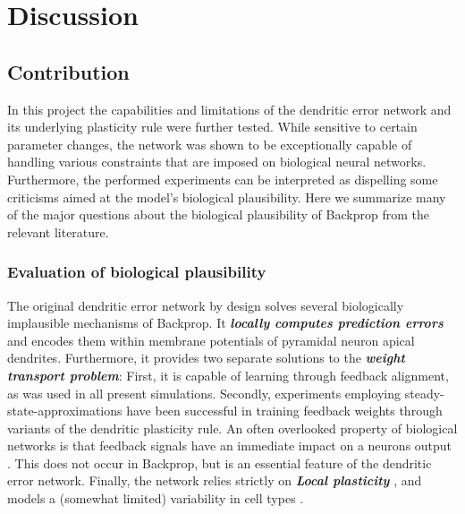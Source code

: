 
\chapter{Discussion}


\section{Contribution}

In this project the capabilities and limitations of the dendritic error network and its underlying plasticity rule were
further tested. While sensitive to certain parameter changes, the network was shown to be exceptionally capable of
handling various constraints that are imposed on biological neural networks. Furthermore, the performed experiments can
be interpreted as dispelling some criticisms aimed at the model's biological plausibility. Here we summarize many of the
major questions about the biological plausibility of Backprop from the relevant literature.


\subsection*{Evaluation of biological plausibility}

The original dendritic error network by design solves several biologically implausible mechanisms of Backprop. It
\textit{\textbf{locally computes prediction errors}} and encodes them within membrane potentials of pyramidal neuron
apical dendrites. Furthermore, it provides two separate solutions to the \textit{\textbf{weight transport problem}}:
First, it is capable of learning through feedback alignment, as was used in all present simulations. Secondly,
experiments employing steady-state-approximations have been successful in training feedback weights through variants of
the dendritic plasticity rule. An often overlooked property of biological networks is that feedback signals have an
immediate impact on a neurons output \citep{Larkum2009,Gilbert2013}. This does not occur in Backprop, but is an
essential feature of the dendritic error network. Finally, the network relies strictly on \textit{\textbf{Local
plasticity}} \citep{Whittington2017}, and models a (somewhat limited) variability in cell types
\citep{Bartunov2018}.\newline

